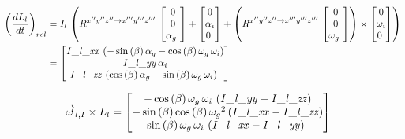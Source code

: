 \begin{align*}
\left(\frac{dL_{l}}{dt}\right)_{rel}&=I_{l}\,\left(R^{x''y''z'' \rightarrow x'''y'''z'''}\,\begin{bmatrix}
0\\
0\\
\alpha_{g}\
\end{bmatrix}
+\begin{bmatrix}
0\\
\alpha_{i}\\
0\
\end{bmatrix}
+\left(R^{x''y''z'' \rightarrow x'''y'''z'''}\,\begin{bmatrix}
0\\
0\\
\omega_{g}\
\end{bmatrix}
\right)\times\begin{bmatrix}
0\\
\omega_{i}\\
0\
\end{bmatrix}
\right)\\
&=\begin{bmatrix}
{\it I\_l\_xx}\, \left( -\sin \left( \beta
 \right) \alpha_{g}-\cos \left( \beta \right) \omega_{g}\,\omega_{i}
 \right) \\ 
 {\it I\_l\_yy}\,\alpha_{i}
\\ 
%
{\it I\_l\_zz}\, \left( \cos \left( \beta
 \right) \alpha_{g}-\sin \left( \beta \right) \omega_{g}\,\omega_{i}
 \right) \
\end{bmatrix}
\end{align*}

\begin{equation*}
\begin{split}
\overrightarrow{\omega}_{l,I}\times L_{l}&=\begin{bmatrix}
-\cos \left( \beta \right) \omega_{g}\,
\omega_{i}\, \left( {\it I\_l\_yy}-{\it I\_l\_zz} \right) 
\\ 
-\sin \left( \beta \right) \cos \left( \beta
 \right) {\omega_{g}}^{2} \left( {\it I\_l\_xx}-{\it I\_l\_zz}
 \right) \\ 
 \sin \left( \beta \right) \omega_{g}\,
\omega_{i}\, \left( {\it I\_l\_xx}-{\it I\_l\_yy} \right) \
\end{bmatrix}
\end{split}
\end{equation*}

